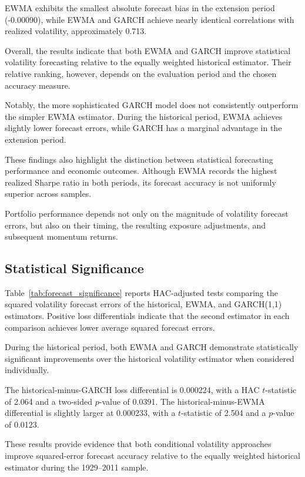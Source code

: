 \documentclass[11pt]{article}
\begin{document}
EWMA exhibits the smallest absolute forecast
bias in the extension period (-0.00090),
while EWMA and GARCH achieve nearly
identical correlations with realized
volatility, approximately 0.713.

Overall, the results indicate that both
EWMA and GARCH improve statistical volatility
forecasting relative to the equally weighted
historical estimator. Their relative ranking,
however, depends on the evaluation period
and the chosen accuracy measure.

Notably, the more sophisticated GARCH model
does not consistently outperform the simpler
EWMA estimator. During the historical period,
EWMA achieves slightly lower forecast errors,
while GARCH has a marginal advantage in the
extension period.

These findings also highlight the distinction
between statistical forecasting performance
and economic outcomes. Although EWMA records
the highest realized Sharpe ratio in both
periods, its forecast accuracy is not
uniformly superior across samples.

Portfolio performance depends not only on
the magnitude of volatility forecast errors,
but also on their timing, the resulting
exposure adjustments, and subsequent
momentum returns.


\subsection{Statistical Significance}



Table~\ref{tab:forecast_significance} reports
HAC-adjusted tests comparing the squared volatility
forecast errors of the historical, EWMA, and
GARCH(1,1) estimators. Positive loss differentials
indicate that the second estimator in each
comparison achieves lower average squared
forecast errors.

During the historical period, both EWMA and
GARCH demonstrate statistically significant
improvements over the historical volatility
estimator when considered individually.

The historical-minus-GARCH loss differential
is 0.000224, with a HAC $t$-statistic of 2.064
and a two-sided $p$-value of 0.0391.
The historical-minus-EWMA differential is
slightly larger at 0.000233, with a
$t$-statistic of 2.504 and a $p$-value
of 0.0123.

These results provide evidence that both
conditional volatility approaches improve
squared-error forecast accuracy relative
to the equally weighted historical estimator
during the 1929--2011 sample.
\end{document}
